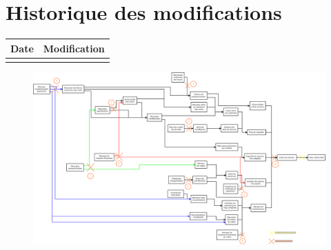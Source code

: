 \section*{Historique des modifications}
\begin{table}[H]
\centering
	\begin{tabularx}{16.8cm}{|X|X|}
	\hline
	Date & Modification \\
	\hline
	  & \\
	\hline
	\end{tabularx}
\end{table}
\newpage

\begin{landscape}
\begin{figure}
	\centering
	\includegraphics[scale=0.35]{images/AnalyseRisque_nPourquoi.png}
\end{figure}
\end{landscape}